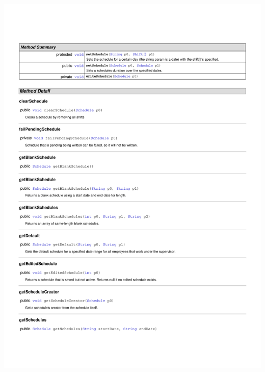 \documentclass[letterpaper,12pt]{report}
\begin{document}
\includegraphics[scale=0.9,trim=20mm 30mm 25mm 25mm]{externals/PersistanceDataDictionary5.pdf}
\newpage
\end{document}
